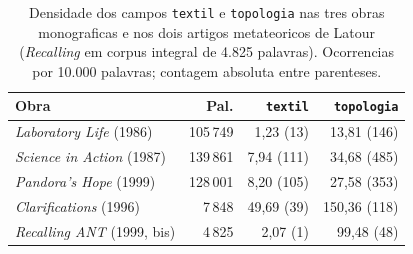 \begin{table}[htbp]
\centering
\caption[Campos textil e topologia, 5 obras de Latour (Etapa 2-bis)]{Densidade dos campos \texttt{textil} e \texttt{topologia} nas tres obras monograficas e nos dois artigos metateoricos de Latour (\emph{Recalling} em corpus integral de 4.825 palavras). Ocorrencias por 10.000 palavras; contagem absoluta entre parenteses.}
\label{tab:textil-topologico-5-obras-bis}
\small
\begin{tabular}{lrrr}
\toprule
Obra & Pal. & \texttt{textil} & \texttt{topologia} \\
\midrule
\emph{Laboratory Life} (1986) & 105\,749 & 1{,}23 (13) & 13{,}81 (146) \\
\emph{Science in Action} (1987) & 139\,861 & 7{,}94 (111) & 34{,}68 (485) \\
\emph{Pandora's Hope} (1999) & 128\,001 & 8{,}20 (105) & 27{,}58 (353) \\
\emph{Clarifications} (1996) & 7\,848 & 49{,}69 (39) & 150{,}36 (118) \\
\emph{Recalling ANT} (1999, bis) & 4\,825 & 2{,}07 (1) & 99{,}48 (48) \\
\bottomrule
\end{tabular}
\end{table}
